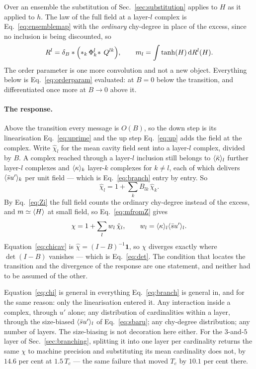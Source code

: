 Over an ensemble the substitution of Sec.~\ref{sec:substitution} applies to
$H$ as it applied to $h$. The law of the full field at a layer-$l$ complex is
Eq.~\eqref{eq:ensemblemap} with the \emph{ordinary} chy-degree in place of the
excess, since no inclusion is being discounted, so
\begin{equation}
  R^{l}=\delta_{B}\ast\Bigl(\ast_{k}\,\Phi^{l}_{k}\!\ast\,Q^{lk}\Bigr),
  \qquad
  m_{l}=\int\tanh(H)\,\mathrm{d}R^{l}(H).
  \label{eq:orderparam}
\end{equation}
The order parameter is one more convolution and not a new object. Everything
below is Eq.~\eqref{eq:orderparam} evaluated: at $B=0$ below the transition,
and differentiated once more at $B\to0$ above it.

\paragraph{The response.} Above the transition every message is $O(B)$, so
the down step is its linearisation Eq.~\eqref{eq:uprime} and the up step
Eq.~\eqref{eq:up} adds the field at the complex. Write $\hat\chi_{l}$ for the
mean cavity field sent into a layer-$l$ complex, divided by $B$. A complex
reached through a layer-$l$ inclusion still belongs to $\langle \bar\kappa \rangle_{l}$ further
layer-$l$ complexes and $\langle \kappa \rangle_{k}$ layer-$k$ complexes for $k\ne l$,
each of which delivers $\langle \bar s u' \rangle_{k}$ per unit field --- which is
Eq.~\eqref{eq:branch} entry by entry. So
\begin{equation}
  \hat\chi_{l}=1+\sum_{k}B_{lk}\,\hat\chi_{k}.
  \label{eq:chicav}
\end{equation}
By Eq.~\eqref{eq:Zi} the full field counts the ordinary chy-degree instead of
the excess, and $m\simeq\langle H \rangle$ at small field, so Eq.~\eqref{eq:mfromZ} gives
\begin{equation}
  \chi=1+\sum_{l}w_{l}\,\hat\chi_{l},
  \qquad
  w_{l}=\langle \kappa \rangle_{l}\langle \bar s u' \rangle_{l}.
  \label{eq:chi}
\end{equation}
Equation~\eqref{eq:chicav} is $\hat\chi=(I-B)^{-1}\mathbf{1}$, so $\chi$
diverges exactly where $\det(I-B)$ vanishes --- which is Eq.~\eqref{eq:det}.
The condition that locates the transition and the divergence of the response
are one statement, and neither had to be assumed of the other.

Equation~\eqref{eq:chi} is general in everything Eq.~\eqref{eq:branch} is
general in, and for the same reason: only the linearisation entered it. Any
interaction inside a complex, through $u'$ alone; any distribution of
cardinalities within a layer, through the size-biased $\langle \bar s u' \rangle_{l}$ of
Eq.~\eqref{eq:sbaru}; any chy-degree distribution; any number of layers. The
size-biasing is not decoration here either. For the $3$-and-$5$ layer of
Sec.~\ref{sec:branching}, splitting it into one layer per cardinality returns
the same $\chi$ to machine precision and substituting its mean cardinality does
not, by $14.6$ per cent at $1.5\,T_{c}$ --- the same failure that moved
$T_{c}$ by $10.1$ per cent there.

